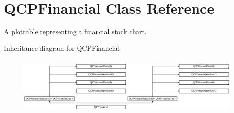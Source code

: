 \hypertarget{class_q_c_p_financial}{}\section{Q\+C\+P\+Financial Class Reference}
\label{class_q_c_p_financial}


A plottable representing a financial stock chart.  


Inheritance diagram for Q\+C\+P\+Financial\+:\begin{figure}[H]
\begin{center}
\leavevmode
\includegraphics[height=2.926829cm]{class_q_c_p_financial}
\end{center}
\end{figure}
